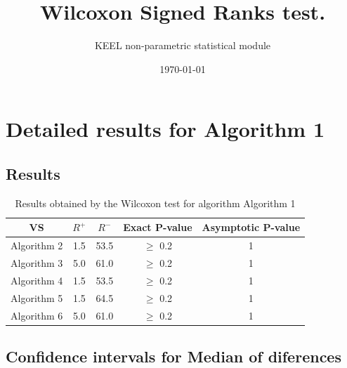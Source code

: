 \documentclass[a4paper,10pt]{article}
\title{Wilcoxon Signed Ranks test.}
\date{\today}
\author{KEEL non-parametric statistical module}
\begin{document}
\pagestyle{empty}
\maketitle
\thispagestyle{empty}



\section{Detailed results for Algorithm 1}


\subsection{Results}

\begin{table}[!htp]
\centering\small
\begin{tabular}{
|c|c|c|c|c|}
\hline
 VS & $R^{+}$ & $R^{-}$ & Exact P-value & Asymptotic P-value \\ \hline 
Algorithm 2 & 1.5 & 53.5 & $\geq$ 0.2 & 1\\ \hline 
Algorithm 3 & 5.0 & 61.0 & $\geq$ 0.2 & 1\\ \hline 
Algorithm 4 & 1.5 & 53.5 & $\geq$ 0.2 & 1\\ \hline 
Algorithm 5 & 1.5 & 64.5 & $\geq$ 0.2 & 1\\ \hline 
Algorithm 6 & 5.0 & 61.0 & $\geq$ 0.2 & 1\\ \hline 

\end{tabular}
\caption{Results obtained by the Wilcoxon test for algorithm Algorithm 1}
\end{table}

\subsection{Confidence intervals for Median of diferences}
\end{document}
